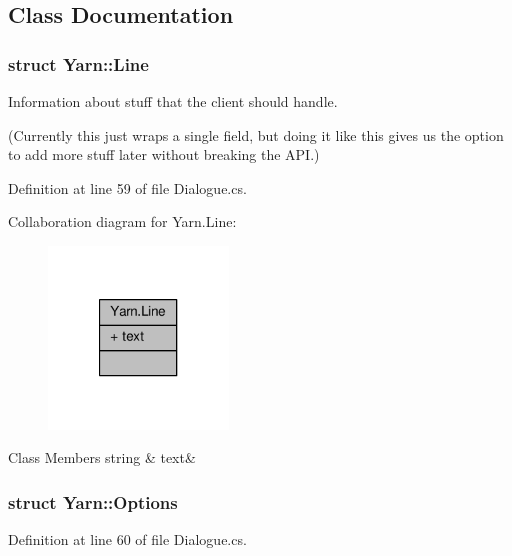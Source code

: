 \subsection{Class Documentation}
\label{a00352}
\hypertarget{a00050_a00352}{}
\subsubsection{struct Yarn\-:\-:Line}
Information about stuff that the client should handle. 

(Currently this just wraps a single field, but doing it like this gives us the option to add more stuff later without breaking the A\-P\-I.) 

Definition at line 59 of file Dialogue.\-cs.



Collaboration diagram for Yarn.\-Line\-:
\nopagebreak
\begin{figure}[H]
\begin{center}
\leavevmode
\includegraphics[width=136pt]{a00364}
\end{center}
\end{figure}
\begin{DoxyFields}{Class Members}
\hypertarget{a00050_a81d1f04bbb4cf6642d2bd685bda1da20}{string}\label{a00050_a81d1f04bbb4cf6642d2bd685bda1da20}
&
text&
\\
\hline

\end{DoxyFields}
\label{a00355}
\hypertarget{a00050_a00355}{}
\subsubsection{struct Yarn\-:\-:Options}


Definition at line 60 of file Dialogue.\-cs.



